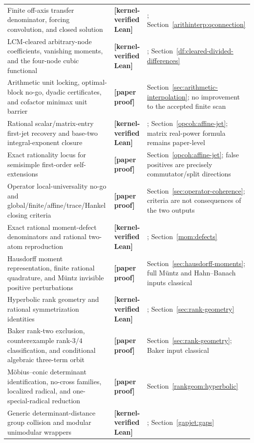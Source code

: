 \documentclass[11pt,oneside]{article}
\theoremstyle{definition}
\theoremstyle{remark}
\newcommand{\lean}[1]{\texttt{\detokenize{#1}}}
\newcommand{\statuslean}{\textcolor{leanblue}{\textbf{[kernel-verified Lean]}}}
\newcommand{\statusnew}{\textcolor{newgreen}{\textbf{[paper proof]}}}
\begin{document}
{\begin{longtable}{>{\raggedright\arraybackslash}p{}
                  >{\raggedright\arraybackslash}p{}
                  >{\raggedright\arraybackslash}p{}}
Finite off-axis transfer denominator, forcing convolution, and closed solution & \statuslean &
\lean{QNewtonOffAxisTransfer}; Section~\ref{arithinterp:qconnection} \\
LCM-cleared arbitrary-node coefficients, vanishing moments, and the four-node cubic
functional & \statuslean & \lean{ClearedDividedDifference};
Section~\ref{df:cleared-divided-differences} \\
Arithmetic unit locking, optimal-block no-go, dyadic certificates, and cofactor minimax unit
barrier & \statusnew & Section~\ref{sec:arithmetic-interpolation}; no improvement to the accepted finite scan \\
Rational scalar/matrix-entry first-jet recovery and base-two integral-exponent closure &
\statuslean & \lean{JordanFirstJet}; Section~\ref{opcoh:affine-jet}; matrix real-power formula
remains paper-level \\
Exact rationality locus for semisimple first-order self-extensions & \statusnew &
Section~\ref{opcoh:affine-jet}; false positives are precisely commutator/split directions \\
Operator local-universality no-go and global/finite/affine/trace/Hankel closing criteria &
\statusnew & Section~\ref{sec:operator-coherence}; criteria are not consequences of the two outputs \\
Exact rational moment-defect denominators and rational two-atom reproduction & \statuslean &
\lean{MomentArithmetic}; Section~\ref{mom:defects} \\
Hausdorff moment representation, finite rational quadrature, and M\"untz invisible positive
perturbations & \statusnew & Section~\ref{sec:hausdorff-moments}; full M\"untz and Hahn--Banach inputs
classical \\
Hyperbolic rank geometry and rational symmetrization identities & \statuslean &
\lean{RankGeometry}; Section~\ref{sec:rank-geometry} \\
Baker rank-two exclusion, counterexample rank-$3/4$ classification, and conditional algebraic
three-term orbit & \statusnew & Section~\ref{sec:rank-geometry}; Baker input classical \\
M\"obius--conic determinant identification, no-cross families, localized radical, and
one-special-radical reduction & \statusnew & Section~\ref{rankgeom:hyperbolic} \\
Generic determinant-distance group collision and modular unimodular wrappers & \statuslean &
\lean{UnimodularGapCollision}; Section~\ref{gapjet:gaps} \\

\end{longtable}}
\end{document}
